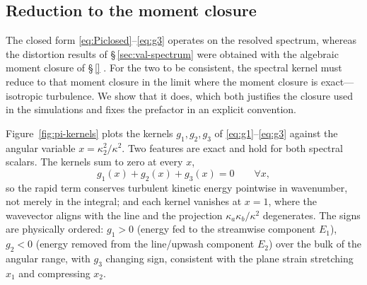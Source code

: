 \documentclass[lineno]{JFM-FLM_Au}
\begin{document}
\subsection{Reduction to the moment closure}\label{sec:lrr-reduction}

The closed form \eqref{eq:Piclosed}--\eqref{eq:g3} operates on the resolved
spectrum, whereas the distortion results of \S\,\ref{sec:val-spectrum} were
obtained with the algebraic moment closure of \S\,\ref{}%
\citep{LaunderReeceRodi1975}. For the two to be consistent, the spectral
kernel must reduce to that moment closure in the limit where the moment
closure is exact---isotropic turbulence. We show that it does, which both
justifies the closure used in the simulations and fixes the prefactor in an
explicit convention.

Figure~\ref{fig:pi-kernels} plots the kernels $g_1,g_2,g_3$ of
\eqref{eq:g1}--\eqref{eq:g3} against the angular variable
$x=\kappa_2^2/\kappa^2$. Two features are exact and hold for both spectral
scalars. The kernels sum to zero at every $x$,
\begin{equation}
  g_1(x)+g_2(x)+g_3(x)=0 \qquad \forall x,
  \label{eq:gtrace}
\end{equation}
so the rapid term conserves turbulent kinetic energy pointwise in wavenumber,
not merely in the integral; and each kernel vanishes at $x=1$, where the
wavevector aligns with the line and the projection $\kappa_a\kappa_b/\kappa^2$
degenerates. The signs are physically ordered: $g_1>0$ (energy fed to the
streamwise component $E_1$), $g_2<0$ (energy removed from the line/upwash
component $E_2$) over the bulk of the angular range, with $g_3$ changing sign,
consistent with the plane strain stretching $x_1$ and compressing $x_2$.
\end{document}
